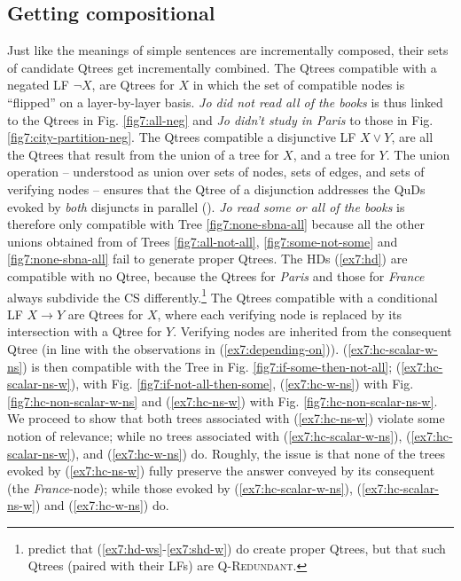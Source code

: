 \subsection{Getting compositional}
Just like the meanings of simple sentences are incrementally composed, their sets of candidate Qtrees get incrementally combined. The Qtrees compatible with a negated LF $\neg X$, are Qtrees for $X$ in which the set of compatible nodes is ``flipped'' on a layer-by-layer basis. \textit{Jo did not read all of the books} is thus linked to the Qtrees in Fig. \ref{fig7:all-neg} and \textit{Jo didn't study in Paris} to those in Fig. \ref{fig7:city-partition-neg}. The Qtrees compatible a disjunctive LF $X \vee Y$, are all the Qtrees that result from the union of a tree for $X$, and a tree for $Y$. The union operation -- understood as union over sets of nodes, sets of edges, and sets of verifying nodes -- ensures that the Qtree of a disjunction addresses the QuDs evoked by \textit{both} disjuncts in parallel (\cite{Simons2001,Zhang2024}). \textit{Jo read some or all of the books} is therefore only compatible with Tree \ref{fig7:none-sbna-all} because all the other unions obtained from of Trees \ref{fig7:all-not-all}, \ref{fig7:some-not-some} and \ref{fig7:none-sbna-all} fail to generate proper Qtrees. The HDs (\ref{ex7:hd}) are compatible with no Qtree, because the Qtrees for \textit{Paris} and those for \textit{France} always subdivide the CS differently.\footnote{\citet{HenotMortier2024a,HenotMortier2024b} predict that (\ref{ex7:hd-ws}-\ref{ex7:shd-w}) do create proper Qtrees, but that such Qtrees (paired with their LFs) are \textsc{Q-Redundant}.} The Qtrees compatible with a conditional LF $X\rightarrow Y$ are Qtrees for $X$, where each verifying node is replaced by its intersection with a Qtree for $Y$. Verifying nodes are inherited from the consequent Qtree (in line with the observations in (\ref{ex7:depending-on})). (\ref{ex7:hc-scalar-w-ns}) is then compatible with the Tree in Fig. \ref{fig7:if-some-then-not-all}; (\ref{ex7:hc-scalar-ns-w}), with Fig. \ref{fig7:if-not-all-then-some}, (\ref{ex7:hc-w-ns}) with Fig. \ref{fig7:hc-non-scalar-w-ns} and (\ref{ex7:hc-ns-w}) with Fig. \ref{fig7:hc-non-scalar-ns-w}. We proceed to show that both trees associated with (\ref{ex7:hc-ns-w}) violate some notion of relevance; while no trees associated with (\ref{ex7:hc-scalar-w-ns}), (\ref{ex7:hc-scalar-ns-w}), and (\ref{ex7:hc-w-ns}) do. Roughly, the issue is that none of the trees evoked by (\ref{ex7:hc-ns-w}) fully preserve the answer conveyed by its consequent (the \textit{France}-node); while those evoked by (\ref{ex7:hc-scalar-w-ns}), (\ref{ex7:hc-scalar-ns-w}) and (\ref{ex7:hc-w-ns}) do.


